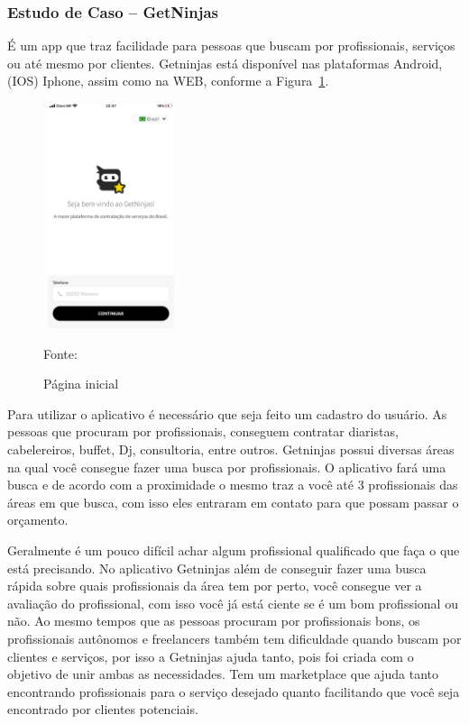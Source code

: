 \newpage
\subsubsection{Estudo de Caso – GetNinjas}

É um app que traz facilidade para pessoas que buscam por profissionais, serviços ou até mesmo por clientes. Getninjas está disponível nas plataformas Android, (IOS) Iphone, assim como na WEB, conforme a Figura~\hypersetup{linkcolor=black}\ref{fig:get}.

\begin{figure}[!h]
	\centering
			
	\caption{Página inicial}
	\includegraphics[width=150px, height=250px]{./images/getNinjasMobile2.jpeg}
	\label{fig:get}
	\par {Fonte: \cite{get-ninjasMobilea}}
\end{figure}

Para utilizar o aplicativo é necessário que seja feito um cadastro do usuário. As pessoas que procuram por profissionais, conseguem contratar diaristas, cabelereiros, buffet, Dj, consultoria, entre outros. Getninjas possui diversas áreas na qual você consegue fazer uma busca por profissionais. O aplicativo fará uma busca e de acordo com a proximidade o mesmo traz a você até 3 profissionais das áreas em que busca, com isso eles entraram em contato para que possam passar o orçamento.

Geralmente é um pouco difícil achar algum profissional qualificado que faça o que está precisando. No aplicativo Getninjas além de conseguir fazer uma busca rápida sobre quais profissionais da área tem por perto, você consegue ver a avaliação do profissional, com isso você já está ciente se é um bom profissional ou não. Ao mesmo tempos que as pessoas procuram por profissionais bons, os profissionais autônomos e freelancers também tem dificuldade quando buscam por clientes e serviços, por isso a Getninjas ajuda tanto, pois foi criada com o objetivo de unir ambas as necessidades. Tem um marketplace que ajuda tanto encontrando profissionais para o serviço desejado quanto facilitando que você seja encontrado por clientes potenciais.

